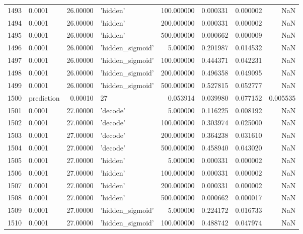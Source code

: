 \documentclass[10pt,a4paper]{article}
\begin{document}
\begin{tabular}{llrlrrrr}
1493 &      0.0001 &  26.00000 &           'hidden' &  100.000000 &  0.000331 &  0.000002 &       NaN \\
1494 &      0.0001 &  26.00000 &           'hidden' &  200.000000 &  0.000331 &  0.000002 &       NaN \\
1495 &      0.0001 &  26.00000 &           'hidden' &  500.000000 &  0.000662 &  0.000009 &       NaN \\
1496 &      0.0001 &  26.00000 &   'hidden\_sigmoid' &    5.000000 &  0.201987 &  0.014532 &       NaN \\
1497 &      0.0001 &  26.00000 &   'hidden\_sigmoid' &  100.000000 &  0.444371 &  0.042231 &       NaN \\
1498 &      0.0001 &  26.00000 &   'hidden\_sigmoid' &  200.000000 &  0.496358 &  0.049095 &       NaN \\
1499 &      0.0001 &  26.00000 &   'hidden\_sigmoid' &  500.000000 &  0.527815 &  0.052777 &       NaN \\
1500 &  prediction &   0.00010 &                 27 &    0.053914 &  0.039980 &  0.077152 &  0.005535 \\
1501 &      0.0001 &  27.00000 &           'decode' &    5.000000 &  0.116225 &  0.008192 &       NaN \\
1502 &      0.0001 &  27.00000 &           'decode' &  100.000000 &  0.303974 &  0.025000 &       NaN \\
1503 &      0.0001 &  27.00000 &           'decode' &  200.000000 &  0.364238 &  0.031610 &       NaN \\
1504 &      0.0001 &  27.00000 &           'decode' &  500.000000 &  0.458940 &  0.043020 &       NaN \\
1505 &      0.0001 &  27.00000 &           'hidden' &    5.000000 &  0.000331 &  0.000002 &       NaN \\
1506 &      0.0001 &  27.00000 &           'hidden' &  100.000000 &  0.000331 &  0.000002 &       NaN \\
1507 &      0.0001 &  27.00000 &           'hidden' &  200.000000 &  0.000331 &  0.000002 &       NaN \\
1508 &      0.0001 &  27.00000 &           'hidden' &  500.000000 &  0.000662 &  0.000017 &       NaN \\
1509 &      0.0001 &  27.00000 &   'hidden\_sigmoid' &    5.000000 &  0.224172 &  0.016733 &       NaN \\
1510 &      0.0001 &  27.00000 &   'hidden\_sigmoid' &  100.000000 &  0.488742 &  0.047974 &       NaN \\

\end{tabular}
\end{document}
